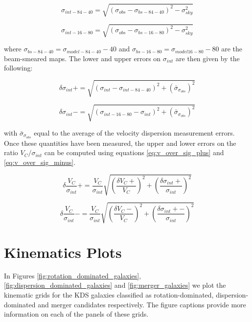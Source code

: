 \documentclass[fleqn,usenatbib]{mnras}
\begin{document}
\begin{equation}\label{eq:sig_84_40}
   \sigma_{int-84-40} = \sqrt{(\sigma_{obs} - \sigma_{bs-84-40})^{2} - \sigma_{sky}^{2}}
\end{equation}

\begin{equation}\label{eq:sig_16_80}
   \sigma_{int-16-80} = \sqrt{\left(\sigma_{obs} - \sigma_{bs-16-80}\right)^{2} - \sigma_{sky}^{2}}
\end{equation}


where $\sigma_{bs-84-40} = \sigma_{model-84-40} - 40$ and $\sigma_{bs-16-80} = \sigma_{model16-80} - 80$ are the beam-smeared maps.
The lower and upper errors on $\sigma_{int}$ are then given by the following:

\begin{equation}\label{eq:sig_plus_error}
   \delta\sigma_{int}+ = \sqrt{\left(\sigma_{int} - \sigma_{int-84-40}\right)^{2} + \left(\bar{\sigma}_{\sigma_{obs}}\right)^{2}}
\end{equation}

\begin{equation}\label{eq:sig_minus_error}
   \delta\sigma_{int}- = \sqrt{\left(\sigma_{int-16-80} - \sigma_{int}\right)^{2} + \left(\bar{\sigma}_{\sigma_{obs}}\right)^{2}}
\end{equation}


with $\bar{\sigma}_{\sigma_{obs}}$ equal to the average of the velocity dispersion measurement errors.
Once these quantities have been measured, the upper and lower errors on the ratio $V_{C}/\sigma_{int}$ can be computed using equations \ref{eq:v_over_sig_plus} and \ref{eq:v_over_sig_minus}.

\begin{equation}\label{eq:v_over_sig_plus}
   \delta\frac{V_{C}}{\sigma_{int}}+ = \frac{V_{C}}{\sigma_{int}}\sqrt{\left(\frac{\delta V_{C}+}{V_{C}}\right)^{2} + \left(\frac{\delta\sigma_{int}+}{\sigma_{int}}\right)^{2}}
\end{equation}

\begin{equation}\label{eq:v_over_sig_minus}
   \delta\frac{V_{C}}{\sigma_{int}}- = \frac{V_{C}}{\sigma_{int}}\sqrt{\left(\frac{\delta V_{C}-}{V_{C}}\right)^{2} + \left(\frac{\delta\sigma_{int}+-}{\sigma_{int}}\right)^{2}}
\end{equation}

\section{Kinematics Plots}\label{app:kinematics_plots}
In Figures \ref{fig:rotation_dominated_galaxies}, \ref{fig:dispersion_dominated_galaxies} and \ref{fig:merger_galaxies} we plot the kinematic grids for the KDS galaxies classified as rotation-dominated, dispersion-dominated and merger candidates respectively.
The figure captions provide more information on each of the panels of these grids.
\end{document}
